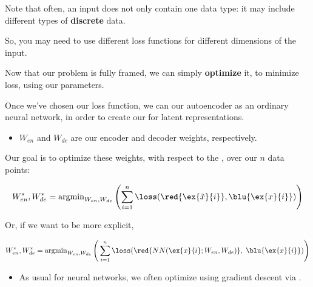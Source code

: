     Note that often, an input does not only contain one data type: it may include different types of \textbf{discrete} data. 

    So, you may need to use different loss functions for different dimensions of the input.

    \subsecdiv

    Now that our problem is fully framed, we can simply \textbf{optimize} it, to minimize loss, using our parameters.\\

    \begin{concept}
        Once we've chosen our loss function, we can  our autoencoder as an ordinary neural network, in order to create our  for latent representations.

        \begin{itemize}
            \item $W_{en}$ and $W_{de}$ are our encoder and decoder weights, respectively.

        \end{itemize}

        Our goal is to optimize these weights, with respect to the , over our $n$ data points:

        \begin{equation*}
            W_{en}^*, W_{de}^* =  \operatorname{argmin}_{W_{en}, W_{de}} 
            \Bigg( {\sum_{i=1}^n \loss(\red{\ex{\tilde{x}}{i}}, \blu{\ex{x}{i}})} \Bigg)
        \end{equation*}
        
        Or, if we want to be more explicit,

        \begin{equation*}
            W_{en}^*, W_{de}^* = \operatorname{argmin}_{W_{en}, W_{de}} 
            \Bigg( \sum_{i=1}^n 
            \loss( \red{NN(\ex{x}{i}; W_{en},W_{de})} ,\; \blu{\ex{x}{i}}) 
            \Bigg)
        \end{equation*}

        \subsecdiv

        \begin{itemize}
            \item As usual for neural networks, we often optimize using gradient descent via .
        \end{itemize}
    \end{concept}


